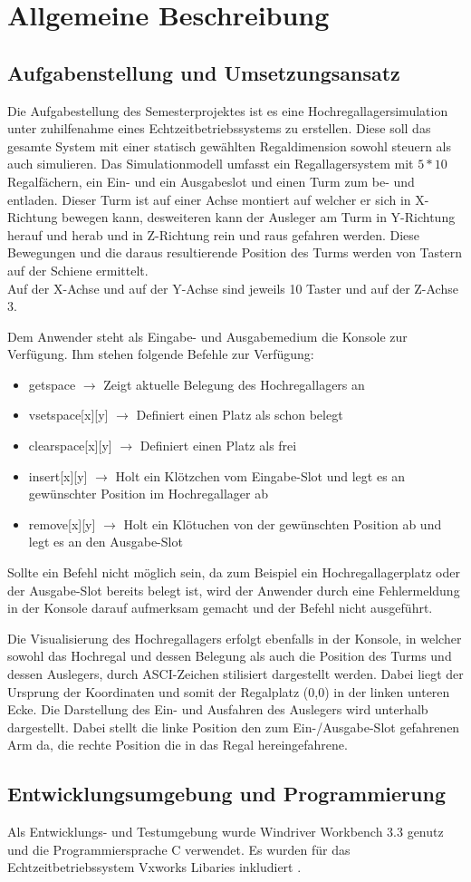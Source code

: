 \section{Allgemeine Beschreibung}
\subsection{Aufgabenstellung und Umsetzungsansatz}
Die Aufgabestellung des Semesterprojektes ist es eine Hochregallagersimulation unter zuhilfenahme eines Echtzeitbetriebssystems zu erstellen. Diese soll das gesamte System mit einer statisch gewählten Regaldimension sowohl steuern als auch simulieren.
Das Simulationmodell umfasst ein Regallagersystem mit $5*10$ Regalfächern, ein Ein- und ein Ausgabeslot und einen Turm zum be- und entladen. Dieser Turm ist auf einer Achse montiert auf welcher er sich in X-Richtung bewegen kann, desweiteren kann der Ausleger am Turm in Y-Richtung herauf und herab und in Z-Richtung rein und raus gefahren werden. Diese Bewegungen und die daraus resultierende Position des Turms werden von Tastern auf der Schiene ermittelt.\\
Auf der X-Achse und auf der Y-Achse sind jeweils 10 Taster und auf der Z-Achse 3.

Dem Anwender steht als Eingabe- und Ausgabemedium die Konsole zur Verfügung.
\newline\newline
Ihm stehen folgende Befehle zur Verfügung:
\begin{itemize} 
	\item getspace $\rightarrow$ Zeigt aktuelle Belegung des Hochregallagers an
	\item vsetspace[x][y] $\rightarrow$ Definiert einen Platz als schon belegt
	\item clearspace[x][y] $\rightarrow$ Definiert einen Platz als frei
	\item insert[x][y] $\rightarrow$ Holt ein Klötzchen vom Eingabe-Slot und legt es an gewünschter Position im Hochregallager ab
	\item remove[x][y] $\rightarrow$ Holt ein Klötuchen von der gewünschten Position ab und legt es an den Ausgabe-Slot
\end{itemize}

Sollte ein Befehl nicht möglich sein, da zum Beispiel ein Hochregallagerplatz oder der Ausgabe-Slot bereits belegt ist, wird der Anwender durch eine Fehlermeldung in der Konsole darauf aufmerksam gemacht und der Befehl nicht ausgeführt.

Die Visualisierung des Hochregallagers erfolgt ebenfalls in der Konsole, in welcher sowohl das Hochregal und dessen Belegung als auch die Position des Turms und dessen Auslegers, durch ASCI-Zeichen stilisiert dargestellt werden.
Dabei liegt der Ursprung der Koordinaten und somit der Regalplatz (0,0) in der linken unteren Ecke.
Die Darstellung des Ein- und Ausfahren des Auslegers wird unterhalb dargestellt. Dabei stellt die linke Position den zum Ein-/Ausgabe-Slot gefahrenen Arm da, die rechte Position die in das Regal hereingefahrene.

\subsection{Entwicklungsumgebung und Programmierung}
Als Entwicklungs- und Testumgebung wurde Windriver Workbench 3.3 genutz und die Programmiersprache C verwendet.
Es wurden für das Echtzeitbetriebssystem Vxworks Libaries inkludiert .


